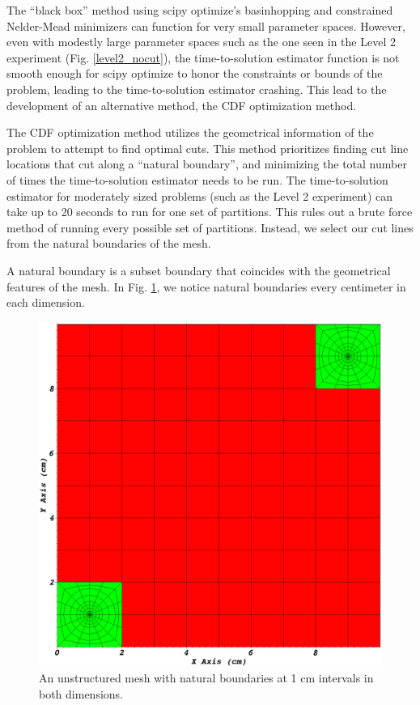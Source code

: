 The ``black box'' method using scipy optimize's basinhopping and constrained Nelder-Mead minimizers can function for very small parameter spaces. 
However, even with modestly large parameter spaces such as the one seen in the Level 2 experiment (Fig. \ref{level2_nocut}), the time-to-solution estimator function is not smooth enough for scipy optimize to honor the constraints or bounds of the problem, leading to the time-to-solution estimator crashing.
This lead to the development of an alternative method, the CDF optimization method.

The CDF optimization method utilizes the geometrical information of the problem to attempt to find optimal cuts. This method prioritizes finding cut line locations that cut along a ``natural boundary'', and minimizing the total number of times the time-to-solution estimator needs to be run.
The time-to-solution estimator for moderately sized problems (such as the Level 2 experiment) can take up to 20 seconds to run for one set of partitions.
This rules out a brute force method of running every possible set of partitions. 
Instead, we select our cut lines from the natural boundaries of the mesh.
 
A natural boundary is a subset boundary that coincides with the geometrical features of the mesh. In Fig. \ref{natural_boundary_example}, we notice natural boundaries every centimeter in each dimension.
 \begin{figure}[h]
\centering
\includegraphics[scale=0.2]{../figures/spiderweb_10x10_sparse.png}
\caption{An unstructured mesh with natural boundaries at 1 cm intervals in both dimensions.}
\label{natural_boundary_example}
\end{figure}

